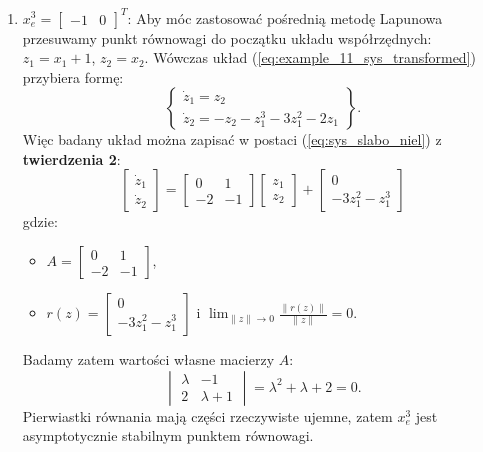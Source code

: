 \documentclass{article}
\begin{document}
\begin{enumerate}
            \item $x_{e}^{3} = \begin{bmatrix} -1 & 0 \end{bmatrix}^{T}$:
            Aby móc zastosować pośrednią metodę Lapunowa przesuwamy punkt równowagi do początku układu współrzędnych: $z_{1} = x_{1} + 1$, $z_{2} = x_{2}$. Wówczas układ (\ref{eq:example_11_sys_transformed}) przybiera formę:
            $$
                \left\{
                \begin{array}{l}
                     \dot{z}_{1} = z_{2}\\
                     \dot{z}_{2} = -z_{2} - z_{1}^{3} - 3z_{1}^{2} - 2z_{1}
                \end{array}
                \right\}.
            $$
            Więc badany układ można zapisać w postaci (\ref{eq:sys_slabo_niel}) z \textbf{twierdzenia 2}:
            $$
                \begin{bmatrix} \dot{z}_{1} \\ \dot{z}_{2} \end{bmatrix}
                =
                \begin{bmatrix} 0 & 1 \\ -2 & -1 \end{bmatrix}
                \begin{bmatrix} z_{1} \\ z_{2} \end{bmatrix}
                +
                \begin{bmatrix} 0 \\ -3z_{1}^{2} - z_{1}^{3} \end{bmatrix}
            $$
            gdzie:
            \begin{itemize}
                \item $A = \begin{bmatrix} 0 & 1 \\ -2 & -1 \end{bmatrix}$,
                \item $r(z) = \begin{bmatrix} 0 \\ -3z_{1}^{2} - z_{1}^{3} \end{bmatrix}$ i $\lim_{\lVert z \rVert \rightarrow 0}\frac{\lVert r(z) \rVert}{\lVert z \rVert} = 0$.
            \end{itemize}
            Badamy zatem wartości własne macierzy $A$:
            $$
                \begin{vmatrix} \lambda & -1\\ 2 & \lambda + 1 \end{vmatrix} = \lambda^{2} + \lambda + 2 = 0.
            $$
            Pierwiastki równania mają części rzeczywiste ujemne, zatem $x_{e}^{3}$ jest asymptotycznie stabilnym punktem równowagi.
        \end{enumerate}
\end{document}
